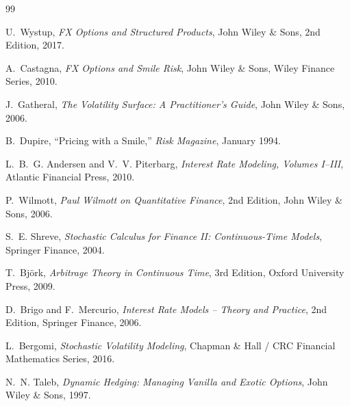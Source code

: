 \begin{thebibliography}{99}

U.~Wystup,
\textit{FX Options and Structured Products},
John Wiley \& Sons,
2nd Edition, 2017.

A.~Castagna,
\textit{FX Options and Smile Risk},
John Wiley \& Sons, Wiley Finance Series,
2010.

J.~Gatheral,
\textit{The Volatility Surface: A Practitioner's Guide},
John Wiley \& Sons,
2006.

B.~Dupire,
``Pricing with a Smile,''
\textit{Risk Magazine},
January 1994.

L.~B.~G. Andersen and V.~V. Piterbarg,
\textit{Interest Rate Modeling, Volumes I--III},
Atlantic Financial Press,
2010.

P.~Wilmott,
\textit{Paul Wilmott on Quantitative Finance},
2nd Edition,
John Wiley \& Sons,
2006.

S.~E. Shreve,
\textit{Stochastic Calculus for Finance II: Continuous-Time Models},
Springer Finance,
2004.

T.~Bj\"{o}rk,
\textit{Arbitrage Theory in Continuous Time},
3rd Edition,
Oxford University Press,
2009.

D.~Brigo and F.~Mercurio,
\textit{Interest Rate Models -- Theory and Practice},
2nd Edition,
Springer Finance,
2006.

L.~Bergomi,
\textit{Stochastic Volatility Modeling},
Chapman \& Hall / CRC Financial Mathematics Series,
2016.

N.~N. Taleb,
\textit{Dynamic Hedging: Managing Vanilla and Exotic Options},
John Wiley \& Sons,
1997.

\end{thebibliography}
